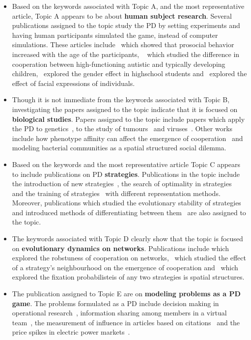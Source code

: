 \documentclass{article}
\theoremstyle{definition}
\begin{document}
\begin{itemize}
    \item Based on the keywords associated with Topic A, and the most
    representative article, Topic A appears to be about \textbf{human subject
    research}. Several publications assigned to the topic study the PD by
    setting experiments and having human participants simulated the game,
    instead of computer simulations. These articles include~\cite{Matsumoto2016}
    which showed that prosocial behavior increased with the age of the
    participants, ~\cite{Li2014} which studied the difference in cooperation
    between high-functioning autistic and typically developing
    children,~\cite{Molina2013} explored the gender effect in highschool
    students and~\cite{Bell2017} explored the effect of facial expressions of
    individuals.
    \item Though it is not immediate from the keywords associated with
    Topic B, investigating the papers assigned to the topic indicate that it
    is focused on \textbf{biological studies}. Papers assigned to the topic include
    papers which apply the PD to genetics~\cite{Santorelli2008, Sistrom2015}, to
    the study of tumours~\cite{archetti2013evolutionary, sartakhti2017} and
    viruses~\cite{turner1999prisoner}. Other works include how phenotype affinity
    can affect the emergence of cooperation~\cite{wu2019phenotype} and modeling
    bacterial communities as a spatial structured social dilemma.
    \item Based on the keywords and the most representative article Topic
    C appears to include publications on PD \textbf{strategies}. Publications
    in the topic include the introduction of new strategies~\cite{stewart2013extortion},
    the search of optimality in strategies~\cite{banerjee2007reaching} and the
    training of strategies~\cite{ishibuchi2011evolution} with different
    representation methods. Moreover, publications which studied the evolutionary
    stability of strategies~\cite{adami2013evolutionary} and introduced methods
    of differentiating between them~\cite{ashlock2008fingerprinting} are
    also assigned to the topic.
    \item The keywords associated with Topic D clearly show that the topic
    is focused on \textbf{evolutionary dynamics on networks}. Publications include
    \cite{ichinose2013robustness} which explored the robstuness of cooperation
    on networks,~\cite{wang2012spatial} which studied the effect of a strategy's neighbourhood
    on the emergence of cooperation and~\cite{chen2016fixation} which explored
    the fixation probabilisteis of any two strategies is spatial
    structures.
    \item The publication assigned to Topic E are on \textbf{modeling problems
    as a PD game}. The problems formulated as a PD include decision making in
    operational research~\cite{ormerod2010or}, information sharing among members
    in a virtual team~\cite{feng2008trilateral}, the measurement of influence
    in articles based on citations~\cite{hutchins2016relative} and the price
    spikes in electric power markets~\cite{Guan2002}.
\end{itemize}
\end{document}
